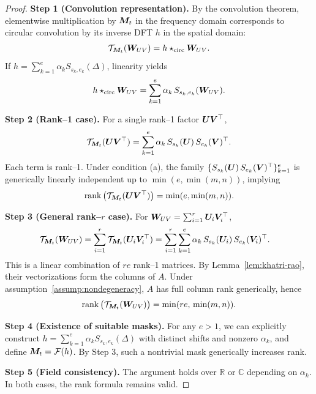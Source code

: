 \documentclass{article}
\theoremstyle{plain}
\theoremstyle{definition}
\theoremstyle{remark}
\begin{document}
\begin{proof}
\textbf{Step 1 (Convolution representation).}
By the convolution theorem, elementwise multiplication by ${\bm{M}}_t$ in the frequency domain corresponds to circular convolution by its inverse DFT $h$ in the spatial domain:
\begin{align}
\mathcal{T}_{{\bm{M}}_t}({\bm{W}}_{UV}) = h \star_{\mathrm{circ}} {\bm{W}}_{UV}. \notag
\end{align}
If $h=\sum_{k=1}^e \alpha_k S_{s_k,e_k}(\Delta)$, linearity yields
\begin{align}
h\star_{\mathrm{circ}} {\bm{W}}_{UV}
  = \sum_{k=1}^e \alpha_k\, S_{s_k,e_k}({\bm{W}}_{UV}). \notag
\end{align}

\textbf{Step 2 (Rank--1 case).}
For a single rank--1 factor ${\bm{U}}{\bm{V}}^\top$,
\begin{align}
\mathcal{T}_{{\bm{M}}_t}({\bm{U}} {\bm{V}}^\top)
  = \sum_{k=1}^e \alpha_k\, S_{s_k}({\bm{U}})\,S_{e_k}({\bm{V}})^\top. \notag
\end{align}
Each term is rank--1.  
Under condition (a), the family $\{S_{s_k}({\bm{U}})\,S_{e_k}({\bm{V}})^\top\}_{k=1}^e$ is generically linearly independent up to $\min(e,\min(m,n))$, implying
\begin{align}
\operatorname{rank}\big(\mathcal{T}_{{\bm{M}}_t}({\bm{U}}{\bm{V}}^\top)\big)
  = \min(e, \min(m,n)). \notag
\end{align}

\textbf{Step 3 (General rank--$r$ case).}
For ${\bm{W}}_{UV}=\sum_{i=1}^r {\bm{U}}_i {\bm{V}}_i^\top$,
\begin{align}
\mathcal{T}_{{\bm{M}}_t}({\bm{W}}_{UV})
  &= \sum_{i=1}^r \mathcal{T}_{{\bm{M}}_t}({\bm{U}}_i {\bm{V}}_i^\top)
   = \sum_{i=1}^r \sum_{k=1}^e \alpha_k\, S_{s_k}({\bm{U}}_i)\,S_{e_k}({\bm{V}}_i)^\top. \notag
\end{align}
This is a linear combination of $r e$ rank--1 matrices.  
By Lemma~\ref{lem:khatri-rao}, their vectorizations form the columns of $A$.  
Under assumption~\ref{assump:nondegeneracy}, $A$ has full column rank generically, hence
\begin{align}
\operatorname{rank}\big(\mathcal{T}_{{\bm{M}}_t}({\bm{W}}_{UV})\big)
  = \min(re,\,\min(m,n)). \notag
\end{align}

\textbf{Step 4 (Existence of suitable masks).}
For any $e>1$, we can explicitly construct $h=\sum_{k=1}^e \alpha_k S_{s_k,e_k}(\Delta)$ with distinct shifts and nonzero $\alpha_k$, and define ${\bm{M}}_t=\mathcal{F}(h)$.  
By Step 3, such a nontrivial mask generically increases rank.

\textbf{Step 5 (Field consistency).}
The argument holds over $\mathbb{R}$ or $\mathbb{C}$ depending on $\alpha_k$.  
In both cases, the rank formula remains valid.
\end{proof}
\end{document}
